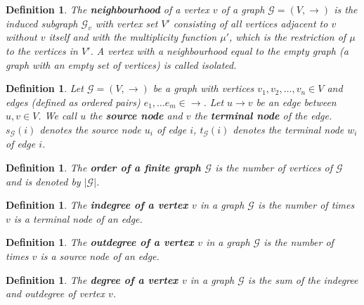\documentclass[a4paper,11pt]{report}
\newtheorem{definition}[theorem]{Definition}
\newcommand{\graf}{\mathscr{G}}
\begin{document}
 \begin{definition}
  The \textbf{neighbourhood} of a vertex $v$ of a graph $\graf=(V,\to)$ is the induced subgraph $\graf_v$ 
 with vertex set $V'$ consisting of all vertices adjacent to $v$ without $v$ itself and with the multiplicity function $\mu'$,
 which is the restriction of $\mu$ to the vertices in $V'$.
 A vertex with a neighbourhood equal to the empty graph (a graph with an empty set of vertices) is called 
 \emph{isolated}.
\end{definition}  
  

 \begin{definition}\label{terminal}
  Let $\graf=(V,\to)$ be a graph with vertices $v_1, v_2, \ldots, v_n \in V$ 
  and edges (defined as ordered pairs) $e_1, \ldots e_m  \in \to$. Let $u \to v$ be an edge between $u, v \in V$. 
  We call $u$ the \textbf{source node} and $v$ the \textbf{terminal node} of the 
  edge. $s_\graf(i)$ denotes the source node $u_i$ of edge $i$, $t_\graf(i)$ denotes the 
  terminal node $w_i$ of edge $i$.
\end{definition}
 
\begin{definition}
  The \textbf{order of a finite graph $\graf$} is the number of vertices of $\graf$ and is denoted by $|\graf|$.  
\end{definition} 
  
  \begin{definition}
    The \textbf{indegree of a vertex $v$} in a graph $\graf$ is the number of times $v$ is a terminal node of an edge. 
    
  \end{definition}
    \begin{definition}
    The \textbf{outdegree of a vertex $v$} in a graph $\graf$ is the number of times $v$ is a source node of an edge. 
    
  \end{definition}
      \begin{definition}
    The \textbf{degree of a vertex $v$} in a graph $\graf$ is the sum of the indegree and outdegree of vertex $v$. 
    
  \end{definition}
  
\end{document}
